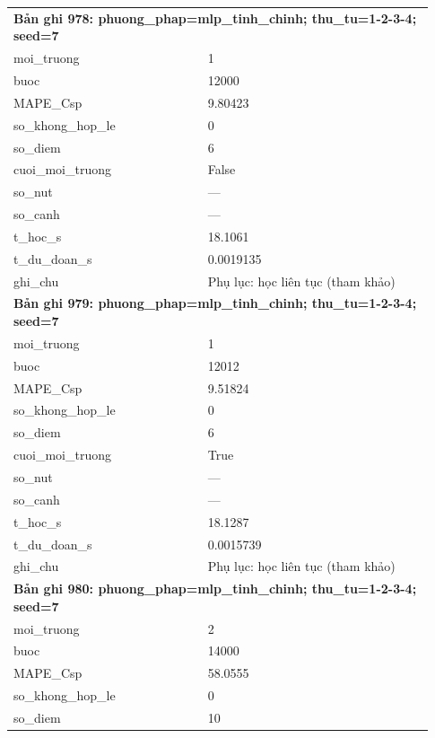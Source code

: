 \begin{longtable}{p{0.43\linewidth}p{0.50\linewidth}}
\midrule
\multicolumn{2}{p{0.95\linewidth}}{\textbf{Bản ghi 978: phuong\_phap=mlp\_tinh\_chinh; thu\_tu=1-2-3-4; seed=7}} \\
moi\_\allowbreak truong & 1 \\
buoc & 12000 \\
MAPE\_\allowbreak Csp & 9.80423 \\
so\_\allowbreak khong\_\allowbreak hop\_\allowbreak le & 0 \\
so\_\allowbreak diem & 6 \\
cuoi\_\allowbreak moi\_\allowbreak truong & False \\
so\_\allowbreak nut & — \\
so\_\allowbreak canh & — \\
t\_\allowbreak hoc\_\allowbreak s & 18.1061 \\
t\_\allowbreak du\_\allowbreak doan\_\allowbreak s & 0.0019135 \\
ghi\_\allowbreak chu & Phụ lục: học liên tục (tham khảo) \\
\midrule
\multicolumn{2}{p{0.95\linewidth}}{\textbf{Bản ghi 979: phuong\_phap=mlp\_tinh\_chinh; thu\_tu=1-2-3-4; seed=7}} \\
moi\_\allowbreak truong & 1 \\
buoc & 12012 \\
MAPE\_\allowbreak Csp & 9.51824 \\
so\_\allowbreak khong\_\allowbreak hop\_\allowbreak le & 0 \\
so\_\allowbreak diem & 6 \\
cuoi\_\allowbreak moi\_\allowbreak truong & True \\
so\_\allowbreak nut & — \\
so\_\allowbreak canh & — \\
t\_\allowbreak hoc\_\allowbreak s & 18.1287 \\
t\_\allowbreak du\_\allowbreak doan\_\allowbreak s & 0.0015739 \\
ghi\_\allowbreak chu & Phụ lục: học liên tục (tham khảo) \\
\midrule
\multicolumn{2}{p{0.95\linewidth}}{\textbf{Bản ghi 980: phuong\_phap=mlp\_tinh\_chinh; thu\_tu=1-2-3-4; seed=7}} \\
moi\_\allowbreak truong & 2 \\
buoc & 14000 \\
MAPE\_\allowbreak Csp & 58.0555 \\
so\_\allowbreak khong\_\allowbreak hop\_\allowbreak le & 0 \\
so\_\allowbreak diem & 10 \\

\end{longtable}
